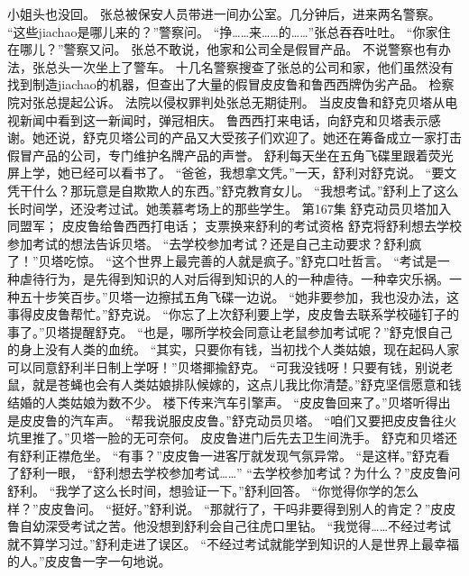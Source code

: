 \documentclass[a4paper,12pt,UTF8,twoside]{ctexbook}
\begin{document}
        小姐头也没回。 
        张总被保安人员带进一间办公室。几分钟后，进来两名警察。 
        “这些jiachao是哪儿来的？”警察问。 
        “挣……来……的……”张总吞吞吐吐。 
        “你家住在哪儿？”警察又问。 
        张总不敢说，他家和公司全是假冒产品。 
        不说警察也有办法，张总头一次坐上了警车。 
        十几名警察搜查了张总的公司和家，他们虽然没有找到制造jiachao的机器，但查出了大量的假冒皮皮鲁和鲁西西牌伪劣产品。 
        检察院对张总提起公诉。 
        法院以侵权罪判处张总无期徒刑。 
        当皮皮鲁和舒克贝塔从电视新闻中看到这一新闻时，弹冠相庆。 
        鲁西西打来电话，向舒克和贝塔表示感谢。她还说，舒克贝塔公司的产品又大受孩子们欢迎了。她还在筹备成立一家打击假冒产品的公司，专门维护名牌产品的声誉。 
        舒利每天坐在五角飞碟里跟着荧光屏上学，她已经可以看书了。 
        “爸爸，我想拿文凭。”一天，舒利对舒克说。 
        “要文凭干什么？那玩意是自欺欺人的东西。”舒克教育女儿。 
        “我想考试。”舒利上了这么长时间学，还没考过试。她羡慕考场上的那些学生。   第167集 
        舒克动员贝塔加入同盟军； 
        皮皮鲁给鲁西西打电话； 
        支票换来舒利的考试资格   
        舒克将舒利想去学校参加考试的想法告诉贝塔。 
        “去学校参加考试？还是自己主动要求？舒利疯了！”贝塔吃惊。 
        “这个世界上最完善的人就是疯子。”舒克口吐哲言。 
        “考试是一种虐待行为，是先得到知识的人对后得到知识的人的一种虐待。一种幸灾乐祸。一种五十步笑百步。”贝塔一边擦拭五角飞碟一边说。 
        “她非要参加，我也没办法，这事得皮皮鲁帮忙。”舒克说。 
        “你忘了上次舒利要上学，皮皮鲁去联系学校碰钉子的事了。”贝塔提醒舒克。 
        “也是，哪所学校会同意让老鼠参加考试呢？”舒克恨自己的身上没有人类的血统。 
        “其实，只要你有钱，当初找个人类姑娘，现在起码人家可以同意舒利半日制上学呀！”贝塔揶揄舒克。 
        “可我没钱呀！只要有钱，别说老鼠，就是苍蝇也会有人类姑娘排队候嫁的，这点儿我比你清楚。”舒克坚信愿意和钱结婚的人类姑娘为数不少。 
        楼下传来汽车引擎声。 
        “皮皮鲁回来了。”贝塔听得出是皮皮鲁的汽车声。 
        “帮我说服皮皮鲁。”舒克动员贝塔。 
        “咱们又要把皮皮鲁往火坑里推了。”贝塔一脸的无可奈何。 
        皮皮鲁进门后先去卫生间洗手。 
        舒克和贝塔还有舒利正襟危坐。 
        “有事？”皮皮鲁一进客厅就发现气氛异常。 
        “是这样。”舒克看了舒利一眼，  “舒利想去学校参加考试……” 
        “去学校参加考试？为什么？”皮皮鲁问舒利。 
        “我学了这么长时间，想验证一下。”舒利回答。 
        “你觉得你学的怎么样？”皮皮鲁问。 
        “挺好。”舒利说。 
        “那就行了，干吗非要得到别人的肯定？”皮皮鲁自幼深受考试之苦。他没想到舒利会自己往虎口里钻。 
        “我觉得……不经过考试就不算学习过。”舒利走进了误区。 
        “不经过考试就能学到知识的人是世界上最幸福的人。”皮皮鲁一字一句地说。 
\end{document}
